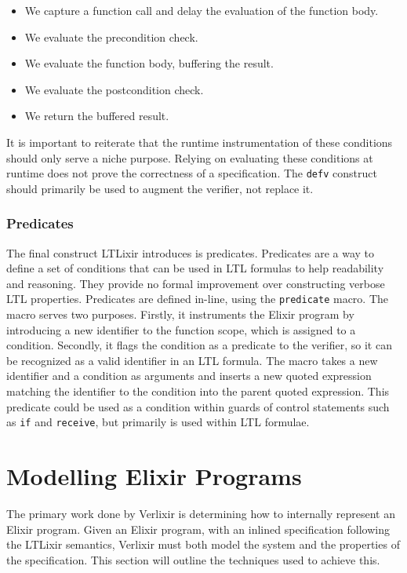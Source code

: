 \begin{itemize}
    \item We capture a function call and delay the evaluation of the function body.
    \item We evaluate the precondition check.
    \item We evaluate the function body, buffering the result.
    \item We evaluate the postcondition check.
    \item We return the buffered result.
\end{itemize}
It is important to reiterate that the runtime instrumentation of these conditions should only serve a niche purpose. Relying on evaluating these conditions at runtime does not prove the correctness of a specification. The \texttt{defv} construct should primarily be used to augment the verifier, not replace it.
\par
\subsubsection{Predicates}
The final construct LTLixir introduces is predicates. Predicates are a way to define a set of conditions that can be used in LTL formulas to help readability and reasoning. They provide no formal improvement over constructing verbose LTL properties. Predicates are defined in-line, using the \texttt{predicate} macro. The macro serves two purposes. Firstly, it instruments the Elixir program by introducing a new identifier to the function scope, which is assigned to a condition. Secondly, it flags the condition as a predicate to the verifier, so it can be recognized as a valid identifier in an LTL formula. The macro takes a new identifier and a condition as arguments and inserts a new quoted expression matching the identifier to the condition into the parent quoted expression. This predicate could be used as a condition within guards of control statements such as \texttt{if} and \texttt{receive}, but primarily is used within LTL formulae.

\section{Modelling Elixir Programs} \label{sec:modelling_elixir_programs}
The primary work done by Verlixir is determining how to internally represent an Elixir program. Given an Elixir program, with an inlined specification following the LTLixir semantics, Verlixir must both model the system and the properties of the specification. This section will outline the techniques used to achieve this.
